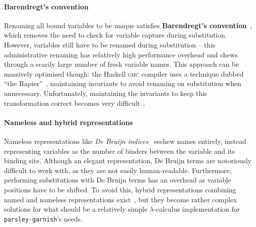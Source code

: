 \documentclass[../../main.tex]{subfiles}
\begin{document}
\paragraph{Barendregt's convention}
Renaming all bound variables to be unique satisfies \textbf{Barendregt's convention}~\cite{barendregt_lambda_1984}, which removes the need to check for variable capture during substitution.
However, variables still have to be renamed during substitution -- this administrative renaming has relatively high performance overhead and chews through a scarily large number of fresh variable names.
This approach can be massively optimised though: the Haskell \textsc{ghc} compiler uses a technique dubbed ``the Rapier''~\cite{peytonjones_secrets_2002}, maintaining invariants to avoid renaming on substitution when unnecessary.
Unfortunately, maintaining the invariants to keep this transformation correct becomes very difficult~\cite{maclaurin_thefoil_2023}.

\paragraph{Nameless and hybrid representations}
Nameless representations like \emph{De Bruijn indices}~\cite{debruijn_lambda_1972} eschew names entirely, instead representing variables as the number of binders between the variable and its binding site.
Although an elegant representation, De Bruijn terms are notoriously difficult to work with, as they are not easily human-readable.
Furthermore, performing substitutions with De Bruijn terms has an overhead as variable positions have to be shifted.
To avoid this, hybrid representations combining named and nameless representations exist~\cite{mcbride_imnotanumber_2004,chargueraud_locally_2012}, but they become rather complex solutions for what should be a relatively simple $\lambda$-calculus implementation for \texttt{parsley-garnish}'s needs.
\end{document}
